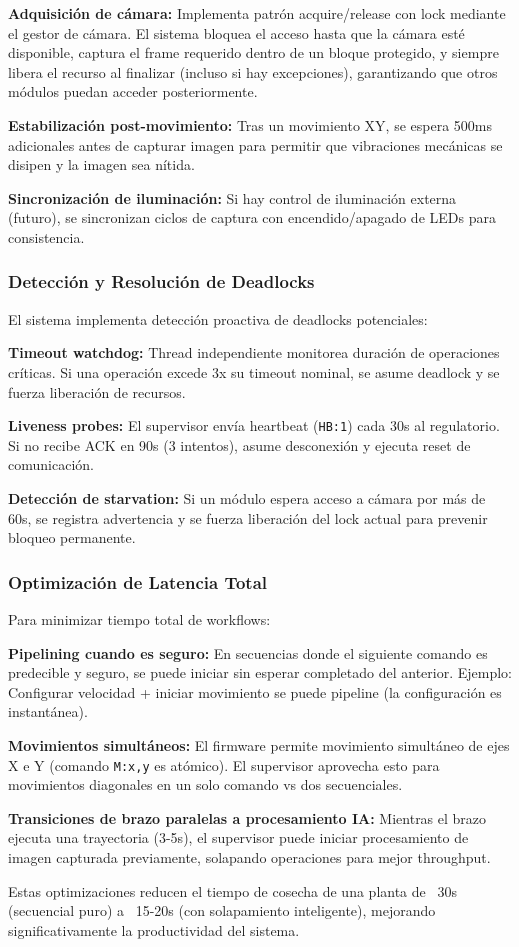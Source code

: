 \textbf{Adquisición de cámara:} Implementa patrón acquire/release con lock mediante el gestor de cámara. El sistema bloquea el acceso hasta que la cámara esté disponible, captura el frame requerido dentro de un bloque protegido, y siempre libera el recurso al finalizar (incluso si hay excepciones), garantizando que otros módulos puedan acceder posteriormente.

\textbf{Estabilización post-movimiento:} Tras un movimiento XY, se espera 500ms adicionales antes de capturar imagen para permitir que vibraciones mecánicas se disipen y la imagen sea nítida.

\textbf{Sincronización de iluminación:} Si hay control de iluminación externa (futuro), se sincronizan ciclos de captura con encendido/apagado de LEDs para consistencia.

\subsubsection{Detección y Resolución de Deadlocks}

El sistema implementa detección proactiva de deadlocks potenciales:

\textbf{Timeout watchdog:} Thread independiente monitorea duración de operaciones críticas. Si una operación excede 3x su timeout nominal, se asume deadlock y se fuerza liberación de recursos.

\textbf{Liveness probes:} El supervisor envía heartbeat (\texttt{HB:1}) cada 30s al regulatorio. Si no recibe ACK en 90s (3 intentos), asume desconexión y ejecuta reset de comunicación.

\textbf{Detección de starvation:} Si un módulo espera acceso a cámara por más de 60s, se registra advertencia y se fuerza liberación del lock actual para prevenir bloqueo permanente.

\subsubsection{Optimización de Latencia Total}

Para minimizar tiempo total de workflows:

\textbf{Pipelining cuando es seguro:} En secuencias donde el siguiente comando es predecible y seguro, se puede iniciar sin esperar completado del anterior. Ejemplo: Configurar velocidad + iniciar movimiento se puede pipeline (la configuración es instantánea).

\textbf{Movimientos simultáneos:} El firmware permite movimiento simultáneo de ejes X e Y (comando \texttt{M:x,y} es atómico). El supervisor aprovecha esto para movimientos diagonales en un solo comando vs dos secuenciales.

\textbf{Transiciones de brazo paralelas a procesamiento IA:} Mientras el brazo ejecuta una trayectoria (3-5s), el supervisor puede iniciar procesamiento de imagen capturada previamente, solapando operaciones para mejor throughput.

Estas optimizaciones reducen el tiempo de cosecha de una planta de ~30s (secuencial puro) a ~15-20s (con solapamiento inteligente), mejorando significativamente la productividad del sistema.
